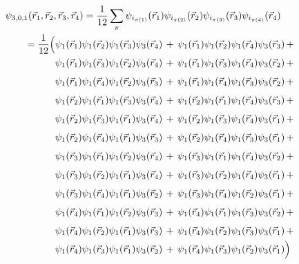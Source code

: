 \begin{align*}
   & \psi_{3, 0, 1}(\vec{r}_1, \vec{r}_2, \vec{r}_3, \vec{r}_4)
  = \frac{1}{12} \sum_\pi
  \psi_{i_{\pi(1)}} (\vec{r}_1)
  \psi_{i_{\pi(2)}} (\vec{r}_2)
  \psi_{i_{\pi(3)}} (\vec{r}_3)
  \psi_{i_{\pi(4)}} (\vec{r}_4)
  \\
   & \qquad = \frac{1}{12} \Bigl(
  \psi_1(\vec{r}_1) \psi_1(\vec{r}_2) \psi_1(\vec{r}_3) \psi_3(\vec{r}_4) \, + \,
  \psi_1(\vec{r}_1) \psi_1(\vec{r}_2) \psi_1(\vec{r}_4) \psi_3(\vec{r}_3) \, + \,
  \\
   & \qquad\qquad\quad\,
  \psi_1(\vec{r}_1) \psi_1(\vec{r}_3) \psi_1(\vec{r}_2) \psi_3(\vec{r}_4) \, + \,
  \psi_1(\vec{r}_1) \psi_1(\vec{r}_3) \psi_1(\vec{r}_4) \psi_3(\vec{r}_2) \, + \,
  \\[1ex]
   & \qquad\qquad\quad\,
  \psi_1(\vec{r}_1) \psi_1(\vec{r}_4) \psi_1(\vec{r}_2) \psi_3(\vec{r}_3) \, + \,
  \psi_1(\vec{r}_1) \psi_1(\vec{r}_4) \psi_1(\vec{r}_3) \psi_3(\vec{r}_2) \, + \,
  \\[1ex]
   & \qquad\qquad\quad\,
  \psi_1(\vec{r}_2) \psi_1(\vec{r}_1) \psi_1(\vec{r}_3) \psi_3(\vec{r}_4) \, + \,
  \psi_1(\vec{r}_2) \psi_1(\vec{r}_1) \psi_1(\vec{r}_4) \psi_3(\vec{r}_3) \, + \,
  \\[1ex]
   & \qquad\qquad\quad\,
  \psi_1(\vec{r}_2) \psi_1(\vec{r}_3) \psi_1(\vec{r}_1) \psi_3(\vec{r}_4) \, + \,
  \psi_1(\vec{r}_2) \psi_1(\vec{r}_3) \psi_1(\vec{r}_4) \psi_3(\vec{r}_1) \, + \,
  \\[1ex]
   & \qquad\qquad\quad\,
  \psi_1(\vec{r}_2) \psi_1(\vec{r}_4) \psi_1(\vec{r}_1) \psi_3(\vec{r}_3) \, + \,
  \psi_1(\vec{r}_2) \psi_1(\vec{r}_4) \psi_1(\vec{r}_3) \psi_3(\vec{r}_1) \, + \,
  \\[1ex]
   & \qquad\qquad\quad\,
  \psi_1(\vec{r}_3) \psi_1(\vec{r}_1) \psi_1(\vec{r}_2) \psi_3(\vec{r}_4) \, + \,
  \psi_1(\vec{r}_3) \psi_1(\vec{r}_1) \psi_1(\vec{r}_4) \psi_3(\vec{r}_2) \, + \,
  \\[1ex]
   & \qquad\qquad\quad\,
  \psi_1(\vec{r}_3) \psi_1(\vec{r}_2) \psi_1(\vec{r}_1) \psi_3(\vec{r}_4) \, + \,
  \psi_1(\vec{r}_3) \psi_1(\vec{r}_2) \psi_1(\vec{r}_4) \psi_3(\vec{r}_1) \, + \,
  \\[1ex]
   & \qquad\qquad\quad\,
  \psi_1(\vec{r}_3) \psi_1(\vec{r}_4) \psi_1(\vec{r}_1) \psi_3(\vec{r}_2) \, + \,
  \psi_1(\vec{r}_3) \psi_1(\vec{r}_4) \psi_1(\vec{r}_2) \psi_3(\vec{r}_1) \, + \,
  \\[1ex]
   & \qquad\qquad\quad\,
  \psi_1(\vec{r}_4) \psi_1(\vec{r}_1) \psi_1(\vec{r}_2) \psi_3(\vec{r}_3) \, + \,
  \psi_1(\vec{r}_4) \psi_1(\vec{r}_1) \psi_1(\vec{r}_3) \psi_3(\vec{r}_2) \, + \,
  \\[1ex]
   & \qquad\qquad\quad\,
  \psi_1(\vec{r}_4) \psi_1(\vec{r}_2) \psi_1(\vec{r}_1) \psi_3(\vec{r}_3) \, + \,
  \psi_1(\vec{r}_4) \psi_1(\vec{r}_2) \psi_1(\vec{r}_3) \psi_3(\vec{r}_1) \, + \,
  \\
   & \qquad\qquad\quad\,
  \psi_1(\vec{r}_4) \psi_1(\vec{r}_3) \psi_1(\vec{r}_1) \psi_3(\vec{r}_2) \, + \,
  \psi_1(\vec{r}_4) \psi_1(\vec{r}_3) \psi_1(\vec{r}_2) \psi_3(\vec{r}_1)
  \Bigr)
\end{align*}

